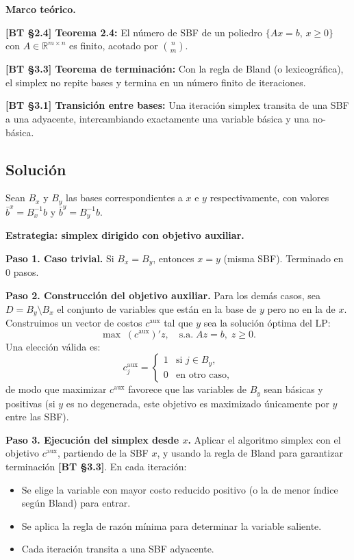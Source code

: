 \documentclass{article}
\newenvironment{marco}{\begin{mdframed}[linecolor=black!40,backgroundcolor=gray!5]\small\textbf{Marco teórico.}\par\smallskip}{\end{mdframed}\medskip}
\begin{document}
\begin{marco}
\textbf{[BT §2.4] Teorema 2.4:} El número de SBF de un poliedro $\{Ax = b,\, x \geq 0\}$ con $A \in \mathbb{R}^{m \times n}$ es finito, acotado por $\binom{n}{m}$.

\textbf{[BT §3.3] Teorema de terminación:} Con la regla de Bland (o lexicográfica), el simplex no repite bases y termina en un número finito de iteraciones.

\textbf{[BT §3.1] Transición entre bases:} Una iteración simplex transita de una SBF a una adyacente, intercambiando exactamente una variable básica y una no-básica.
\end{marco}

\subsection*{Solución}

Sean $B_x$ y $B_y$ las bases correspondientes a $x$ e $y$ respectivamente, con valores $\bar{b}^x = B_x^{-1}b$ y $\bar{b}^y = B_y^{-1}b$.

\medskip
\textbf{Estrategia: simplex dirigido con objetivo auxiliar.}

\textbf{Paso 1. Caso trivial.} Si $B_x = B_y$, entonces $x = y$ (misma SBF). Terminado en $0$ pasos.

\textbf{Paso 2. Construcción del objetivo auxiliar.} Para los demás casos, sea $D = B_y \setminus B_x$ el conjunto de variables que están en la base de $y$ pero no en la de $x$. Construimos un vector de costos $c^{\text{aux}}$ tal que $y$ sea la solución óptima del LP:
\[
  \max\; (c^{\text{aux}})'z, \quad \text{s.a.}\; Az = b,\; z \geq 0.
\]
Una elección válida es:
\[
  c^{\text{aux}}_j = \begin{cases} 1 & \text{si } j \in B_y, \\ 0 & \text{en otro caso,} \end{cases}
\]
de modo que maximizar $c^{\text{aux}}$ favorece que las variables de $B_y$ sean básicas y positivas (si $y$ es no degenerada, este objetivo es maximizado únicamente por $y$ entre las SBF).

\textbf{Paso 3. Ejecución del simplex desde $x$.} Aplicar el algoritmo simplex con el objetivo $c^{\text{aux}}$, partiendo de la SBF $x$, y usando la regla de Bland para garantizar terminación \textbf{[BT §3.3]}. En cada iteración:
\begin{itemize}
  \item Se elige la variable con mayor costo reducido positivo (o la de menor índice según Bland) para entrar.
  \item Se aplica la regla de razón mínima para determinar la variable saliente.
  \item Cada iteración transita a una SBF adyacente.
\end{itemize}
\end{document}
